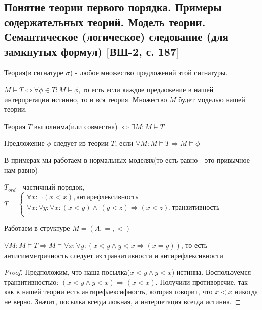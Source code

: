 \documentclass[a4paper, fleqn]{article}
\begin{document}
    \subsection{Понятие теории первого порядка. Примеры содержательных теорий. Модель теории. Семантическое (логическое) следование (для замкнутых формул) [ВШ-2, с. 187]}
        \begin{definition}
            Теория(в сигнатуре $\sigma$) - любое множество предложений этой 
            сигнатуры. 
        \end{definition}
        \begin{definition}
            $M \vDash T \iff \forall \phi \in T : M \vDash \phi$, то есть 
            если каждое предложение в нашей интерпретации истинно, то 
            и вся теория. Множество $M$ будет моделью нашей теории.
        \end{definition}
        \begin{definition}
            Теория $T$ выполнима(или совместна) $\iff \exists
            M :  M \vDash T$
        \end{definition}
        \begin{definition}
            Предложение $\phi$ следует из теории $T$, если $\forall 
            M : M \vDash T \Rightarrow M \vDash \phi$
        \end{definition}
        В примерах мы работаем в нормальных моделях(то есть равно - это привычное нам равно)
        \begin{example}
            $T_{ord}$ - частичный порядок,
            $T = 
            \begin{cases}
                \forall x : \neg (x < x), \text{антирефлексивность} \\
                \forall x : \forall y : \forall x : (x < y) \wedge\ (y < z) \Rightarrow (x < z), \text{транзитивность} \\
            \end{cases}$

            Работаем в структуре $M = (A, =, <)$       
        \end{example}
        \begin{proposition}
            $\forall M : M \vDash T \Rightarrow M \vDash  \forall x : \forall y : (x < y \wedge y < x \Rightarrow (x = y))$, то есть 
            антисимметричность следует из транзитивности и антирефлексивности
     
        \end{proposition}
        \begin{proof}
            Предположим, что наша посылка($x < y \wedge y < x$) истинна. Воспользуемся 
            транзитивностью: $(x < y \wedge y < x) \Rightarrow (x < x)$. Получили 
            противоречие, так как в нашей теории есть антирефлексифность, которая говорит, что 
            $x < x$ никогда не верно. Значит, посылка всегда ложная, а интерпетация 
            всегда истинна.
        \end{proof}
\end{document}
